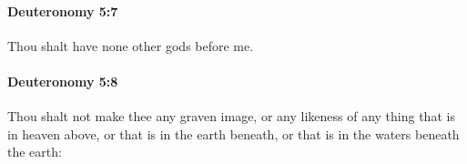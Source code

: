 		\paragraph{Deuteronomy 5:7} %
			\label{DEUTERONOMY-5-7}

			Thou shalt have none other gods before me.


		\paragraph{Deuteronomy 5:8} %
			\label{DEUTERONOMY-5-8}

			Thou shalt not make thee any graven image, or any likeness of any thing that is in heaven above, or that is in the earth beneath, or that is in the waters beneath the earth:


